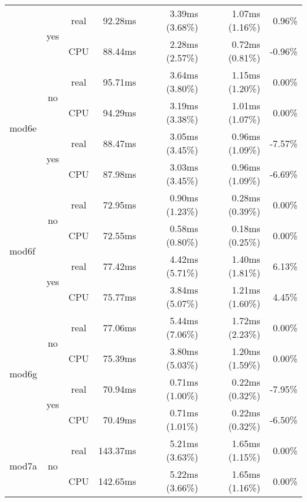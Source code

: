 \documentclass[en]{pracamgr}
\begin{document}
\begin{small}
\begin{longtable}{|l|c|c|r|r|r|r|}
                          \cline{2-7}
                          & \multirow{2}{*}{yes} & real & 92.28ms & 3.39ms (3.68\%) & 1.07ms (1.16\%) & 0.96\% \\*
                          &                      & CPU  & 88.44ms & 2.28ms (2.57\%) & 0.72ms (0.81\%) & -0.96\% \\
\hline
\multirow{4}{*}{mod6e}    & \multirow{2}{*}{no}  & real & 95.71ms & 3.64ms (3.80\%) & 1.15ms (1.20\%) & 0.00\% \\*
                          &                      & CPU  & 94.29ms & 3.19ms (3.38\%) & 1.01ms (1.07\%) & 0.00\% \\*
                          \cline{2-7}
                          & \multirow{2}{*}{yes} & real & 88.47ms & 3.05ms (3.45\%) & 0.96ms (1.09\%) & -7.57\% \\*
                          &                      & CPU  & 87.98ms & 3.03ms (3.45\%) & 0.96ms (1.09\%) & -6.69\% \\
\hline
\multirow{4}{*}{mod6f}    & \multirow{2}{*}{no}  & real & 72.95ms & 0.90ms (1.23\%) & 0.28ms (0.39\%) & 0.00\% \\*
                          &                      & CPU  & 72.55ms & 0.58ms (0.80\%) & 0.18ms (0.25\%) & 0.00\% \\*
                          \cline{2-7}
                          & \multirow{2}{*}{yes} & real & 77.42ms & 4.42ms (5.71\%) & 1.40ms (1.81\%) & 6.13\% \\*
                          &                      & CPU  & 75.77ms & 3.84ms (5.07\%) & 1.21ms (1.60\%) & 4.45\% \\
\hline
\multirow{4}{*}{mod6g}    & \multirow{2}{*}{no}  & real & 77.06ms & 5.44ms (7.06\%) & 1.72ms (2.23\%) & 0.00\% \\*
                          &                      & CPU  & 75.39ms & 3.80ms (5.03\%) & 1.20ms (1.59\%) & 0.00\% \\*
                          \cline{2-7}
                          & \multirow{2}{*}{yes} & real & 70.94ms & 0.71ms (1.00\%) & 0.22ms (0.32\%) & -7.95\% \\*
                          &                      & CPU  & 70.49ms & 0.71ms (1.01\%) & 0.22ms (0.32\%) & -6.50\% \\
\hline
\multirow{4}{*}{mod7a}    & \multirow{2}{*}{no}  & real & 143.37ms & 5.21ms (3.63\%) & 1.65ms (1.15\%) & 0.00\% \\*
                          &                      & CPU  & 142.65ms & 5.22ms (3.66\%) & 1.65ms (1.16\%) & 0.00\% \\*

\end{longtable}
\end{small}
\end{document}

